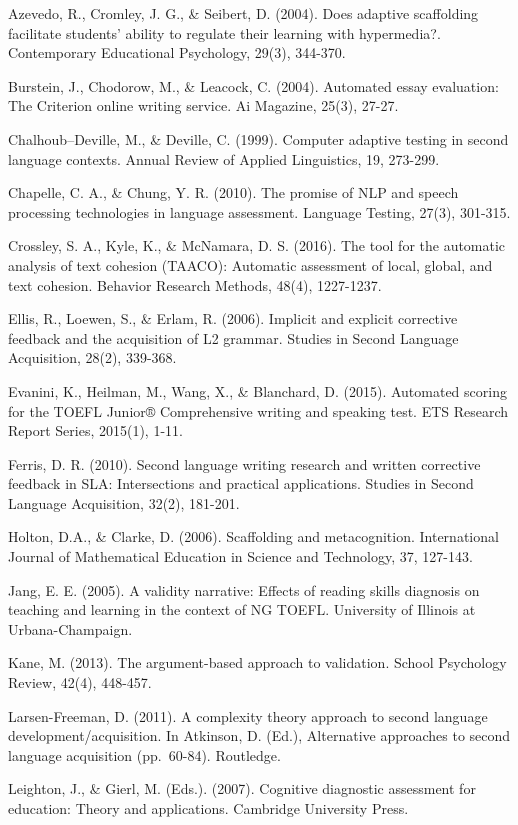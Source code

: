 \documentclass[
]{book}
\begin{document}
Azevedo, R., Cromley, J. G., \& Seibert, D. (2004). Does adaptive scaffolding facilitate students' ability to regulate their learning with hypermedia?. Contemporary Educational Psychology, 29(3), 344-370.

Burstein, J., Chodorow, M., \& Leacock, C. (2004). Automated essay evaluation: The Criterion online writing service. Ai Magazine, 25(3), 27-27.

Chalhoub--Deville, M., \& Deville, C. (1999). Computer adaptive testing in second language contexts. Annual Review of Applied Linguistics, 19, 273-299.

Chapelle, C. A., \& Chung, Y. R. (2010). The promise of NLP and speech processing technologies in language assessment. Language Testing, 27(3), 301-315.

Crossley, S. A., Kyle, K., \& McNamara, D. S. (2016). The tool for the automatic analysis of text cohesion (TAACO): Automatic assessment of local, global, and text cohesion. Behavior Research Methods, 48(4), 1227-1237.

Ellis, R., Loewen, S., \& Erlam, R. (2006). Implicit and explicit corrective feedback and the acquisition of L2 grammar. Studies in Second Language Acquisition, 28(2), 339-368.

Evanini, K., Heilman, M., Wang, X., \& Blanchard, D. (2015). Automated scoring for the TOEFL Junior® Comprehensive writing and speaking test. ETS Research Report Series, 2015(1), 1-11.

Ferris, D. R. (2010). Second language writing research and written corrective feedback in SLA: Intersections and practical applications. Studies in Second Language Acquisition, 32(2), 181-201.

Holton, D.A., \& Clarke, D. (2006). Scaffolding and metacognition. International Journal of Mathematical Education in Science and Technology, 37, 127-143.

Jang, E. E. (2005). A validity narrative: Effects of reading skills diagnosis on teaching and learning in the context of NG TOEFL. University of Illinois at Urbana-Champaign.

Kane, M. (2013). The argument-based approach to validation. School Psychology Review, 42(4), 448-457.

Larsen-Freeman, D. (2011). A complexity theory approach to second language development/acquisition. In Atkinson, D. (Ed.), Alternative approaches to second language acquisition (pp.~60-84). Routledge.

Leighton, J., \& Gierl, M. (Eds.). (2007). Cognitive diagnostic assessment for education: Theory and applications. Cambridge University Press.
\end{document}
